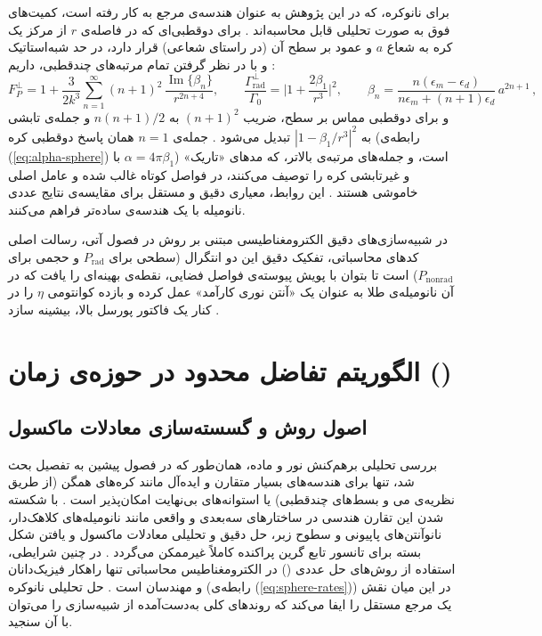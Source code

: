 \documentclass[12pt,a4paper]{report}
\newcommand{\sub}[1]{\mathrm{#1}}               %
\newcommand{\Imag}{\operatorname{Im}}
\begin{document}
برای نانوکره، که در این پژوهش به عنوان هندسه‌ی مرجع به کار رفته است، کمیت‌های فوق به صورت تحلیلی قابل محاسبه‌اند \cite{gersten,ruppin}. برای دوقطبی‌ای که در فاصله‌ی $r$ از مرکز یک کره به شعاع $a$ و عمود بر سطح آن (در راستای شعاعی) قرار دارد، در حد شبه‌استاتیک و با در نظر گرفتن تمام مرتبه‌های چندقطبی، داریم \cite{ruppin,mertens}:
\begin{equation}\label{eq:sphere-rates}
F_P^{\perp}=1+\frac{3}{2k^3}\sum_{n=1}^{\infty}(n+1)^2\,\frac{\Imag\{\beta_n\}}{r^{2n+4}},\qquad
\frac{\Gamma_{\sub{rad}}^{\perp}}{\Gamma_0}=\Big|1+\frac{2\beta_1}{r^3}\Big|^2,\qquad
\beta_n=\frac{n(\epsilon_m-\epsilon_d)}{n\epsilon_m+(n+1)\epsilon_d}\,a^{2n+1}\,,
\end{equation}
و برای دوقطبی مماس بر سطح، ضریب $(n+1)^2$ به $n(n+1)/2$ و جمله‌ی تابشی به $|1-\beta_1/r^3|^2$ تبدیل می‌شود \cite{ruppin}. جمله‌ی $n=1$ همان پاسخ دوقطبی کره (رابطه‌ی (\ref{eq:alpha-sphere}) با $\alpha=4\pi\beta_1$) است، و جمله‌های مرتبه‌ی بالاتر، که مدهای «تاریک» و غیرتابشی کره را توصیف می‌کنند، در فواصل کوتاه غالب شده و عامل اصلی خاموشی هستند \cite{ruppin,mertens}. این روابط، معیاری دقیق و مستقل برای مقایسه‌ی نتایج عددی نانومیله با یک هندسه‌ی ساده‌تر فراهم می‌کنند.

در شبیه‌سازی‌های دقیق الکترومغناطیسی مبتنی بر روش  در فصول آتی، رسالت اصلی کدهای محاسباتی، تفکیک دقیق این دو انتگرال (سطحی برای $P_{\sub{rad}}$ و حجمی برای $P_{\sub{nonrad}}$) است تا بتوان با پویش پیوسته‌ی فواصل فضایی، نقطه‌ی بهینه‌ای را یافت که در آن نانومیله‌ی طلا به عنوان یک «آنتن نوری کارآمد» عمل کرده و بازده کوانتومی $\eta$ را در کنار یک فاکتور پورسل بالا، بیشینه سازد \cite{novotny,maier}.

\chapter{الگوریتم تفاضل محدود در حوزه‌ی زمان ()}

\section{اصول روش  و گسسته‌سازی معادلات ماکسول}
بررسی تحلیلی برهم‌کنش نور و ماده، همان‌طور که در فصول پیشین به تفصیل بحث شد، تنها برای هندسه‌های بسیار متقارن و ایده‌آل مانند کره‌های همگن (از طریق نظریه‌ی می و بسط‌های چندقطبی) یا استوانه‌های بی‌نهایت امکان‌پذیر است \cite{novotny,maier,mie}. با شکسته شدن این تقارن هندسی در ساختارهای سه‌بعدی و واقعی مانند نانومیله‌های کلاهک‌دار، نانوآنتن‌های پاپیونی و سطوح زبر، حل دقیق و تحلیلی معادلات ماکسول و یافتن شکل بسته برای تانسور تابع گرین پراکنده کاملاً غیرممکن می‌گردد \cite{novotny}. در چنین شرایطی، استفاده از روش‌های حل عددی () در الکترومغناطیس محاسباتی تنها راهکار فیزیک‌دانان و مهندسان است \cite{taflove,novotny}. حل تحلیلی نانوکره (رابطه‌ی (\ref{eq:sphere-rates})) در این میان نقش یک مرجع مستقل را ایفا می‌کند که روندهای کلی به‌دست‌آمده از شبیه‌سازی را می‌توان با آن سنجید.
\end{document}
